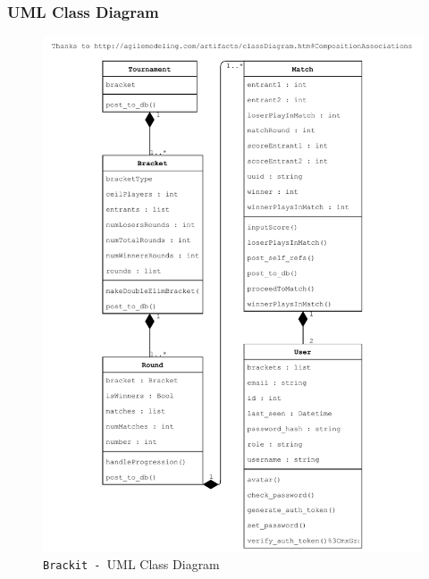 \documentclass{article}
\begin{document}
\subsubsection{UML Class Diagram}
\begin{center}
    \begin{figure}[htp]
        \centering
        \includegraphics[width=13cm]{../diagrams/uml_class_tourn.pdf}
        \caption{\texttt{Brackit - }UML Class Diagram}
        \end{figure}
\end{center}
\clearpage
\end{document}
